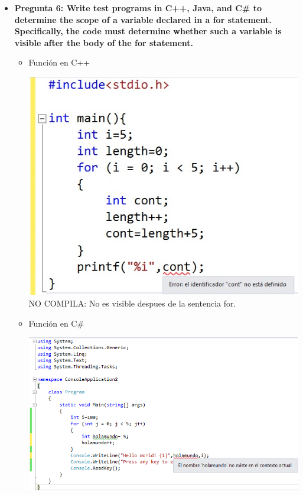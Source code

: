 \documentclass[12pt,oneside]{article}
\begin{document}
\begin{itemize}
				\item {\bf Pregunta 6: Write test programs in C++, Java, and C\# to determine the scope of a variable declared in a for statement. Specifically, the code must determine whether such a variable is visible after the body of the for statement.}
					\begin{itemize}
						\item {Función en C++}
							\begin{center}
								\includegraphics[scale=0.6]{Imagenes/3.jpg}\\
								NO COMPILA: No es visible despues de la sentencia for.
							\end{center}
						\item {Función en C\#}
							\begin{center}
								\includegraphics[scale=0.8]{Imagenes/4.jpg}\\

\end{center}
\end{itemize}
\end{itemize}
\end{document}
